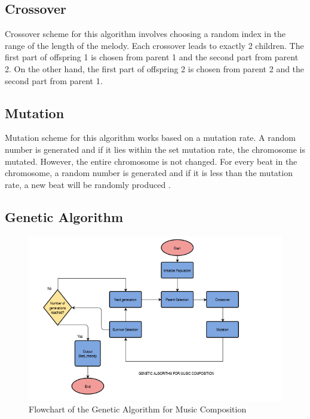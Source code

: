 \documentclass[conference]{IEEEtran}
\begin{document}
\subsection{Crossover}
Crossover scheme for this algorithm involves choosing a random index in the range of the length of the melody. Each crossover leads to exactly 2 children. The first part of offspring 1 is chosen from parent 1 and the second part from parent 2. On the other hand, the first part of offspring 2 is chosen from parent 2 and the second part from parent 1.

\subsection{Mutation}
Mutation scheme for this algorithm works based on a mutation rate. A random number is generated and if it lies within the set mutation rate, the chromosome is mutated. However, the entire chromosome is not changed. For every beat in the chromosome, a random number is generated and if it is less than the mutation rate, a new beat will be randomly produced \cite{b7}.

\subsection{Genetic Algorithm}

\begin{figure}
\includegraphics[width=10 cm, height= 10 cm ]{Flowchart.png}
\caption{ Flowchart of the Genetic Algorithm for Music Composition}
\label{flow}
\end{figure}
\end{document}
